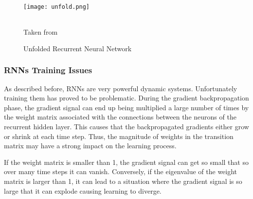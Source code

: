 \begin{figure}

\center
\texttt{[image: unfold.png]}
\caption{Unfolded Recurrent Neural Network}
\label{fig:unfold}
\begin{minipage}{12cm}
    \footnotesize
    \center
    \emph \\ Taken from \cite{lecun2015deep}
    \end{minipage}
\end{figure}



\subsubsection{RNNs Training Issues}
As described before, RNNs are very powerful dynamic systems. Unfortunately training them has proved to be problematic. During the gradient backpropagation phase, the gradient signal can end up being multiplied a large number of times by the weight matrix associated with the connections between the neurons of the recurrent hidden layer. This causes that the backpropagated gradients either grow or shrink at each time step. Thus, the magnitude of weights in the transition matrix may have a strong impact on the learning process.

If the  weight matrix is smaller than 1, the gradient signal can get so small that so over many time steps it can vanish. Conversely, if the eigenvalue of the weight matrix is larger than 1, it can lead to a situation where the gradient signal is so large that it can explode causing learning to diverge. 


